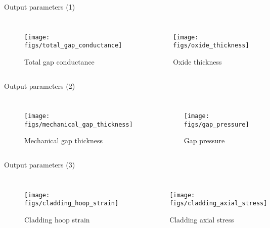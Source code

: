 \documentclass[11pt]{beamer}
\begin{document}
\begin{frame}{Output parameters (1)}
  \footnotesize 
  
  \begin{columns}[t]


  \begin{figure}[h]
    \texttt{[image: figs/total\_gap\_conductance]}
    \caption{Total gap conductance}
    \label{fig:conduct}    
  \end{figure}  


  \begin{figure}[h]
    \texttt{[image: figs/oxide\_thickness]}    
    \caption{Oxide thickness}
    \label{fig:oxide}
  \end{figure}  
  
  \end{columns}

\end{frame}


\begin{frame}{Output parameters (2)}
  \footnotesize 
  
  \begin{columns}[t]


  \begin{figure}[h]
    \texttt{[image: figs/mechanical\_gap\_thickness]}
    \caption{Mechanical gap thickness}
  \end{figure}  


  \begin{figure}[h]
    \texttt{[image: figs/gap\_pressure]}    
    \caption{Gap pressure}
  \end{figure}  
  
  \end{columns}

\end{frame}

\begin{frame}{Output parameters (3)}
  \footnotesize 
  
  \begin{columns}[t]


  \begin{figure}[h]
    \texttt{[image: figs/cladding\_hoop\_strain]}
    \caption{Cladding hoop strain}
  \end{figure}  


  \begin{figure}[h]
    \texttt{[image: figs/cladding\_axial\_stress]}    
    \caption{Cladding axial stress}
  \end{figure}  
  
  \end{columns}

\end{frame}
\end{document}
